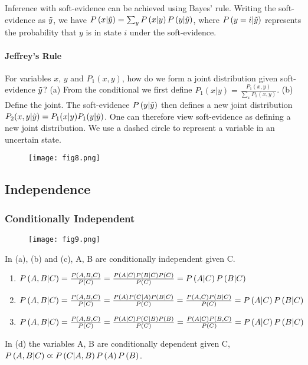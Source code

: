 Inference with soft-evidence can be achieved using Bayes' rule. Writing the soft-evidence as $\ti{y}$, we have $\P{x|\ti{y}}=\sum_y\P{x|y}\P{y|\ti{y}}$, where $\P{y=i|\ti{y}}$ represents the probability that $y$ is in state $i$ under the soft-evidence.

\paragraph{Jeffrey's Rule}

For variables $x$, $y$ and $P_1(x,y)$, how do we form a joint distribution given soft-evidence $\ti{y}$? (a) From the conditional we first define $P_1(x|y)=\frac{P_1(x,y)}{\sum_xP_1(x,y)}$. (b) Define the joint. The soft-evidence $\P{y|\ti{y}}$ then defines a new joint distribution $P_2(x,y|\ti{y})=P_1(x|y)P_1(y|\ti{y})$. One can therefore view soft-evidence as defining a new joint distribution. We use a dashed circle to represent a variable in an uncertain state.
\begin{figure*}[h]
	\centering
	\texttt{[image: fig8.png]}
\end{figure*}

\subsection{Independence}

\subsubsection*{Conditionally Independent}

\begin{figure*}[h]
	\centering
	\texttt{[image: fig9.png]}
\end{figure*}
In (a), (b) and (c), A, B are conditionally independent given C.
\begin{enumerate}[label=(\alph*)]
	\item $\P{A,B|C}=\frac{\P{A,B,C}}{\P{C}}=\frac{\P{A|C}\P{B|C}\P{C}}{\P{C}}=\P{A|C}\P{B|C}$
	\item $\P{A,B|C}=\frac{\P{A,B,C}}{\P{C}}=\frac{\P{A}\P{C|A}\P{B|C}}{\P{C}}=\frac{\P{A,C}\P{B|C}}{\P{C}}=\P{A|C}\P{B|C}$
	\item $\P{A,B|C}=\frac{\P{A,B,C}}{\P{C}}=\frac{\P{A|C}\P{C|B}\P{B}}{\P{C}}=\frac{\P{A|C}\P{B,C}}{\P{C}}=\P{A|C}\P{B|C}$
\end{enumerate}
In (d) the variables A, B are conditionally dependent given C, $\P{A,B|C}\prop\P{C|A,B}\P{A}\P{B}$.

